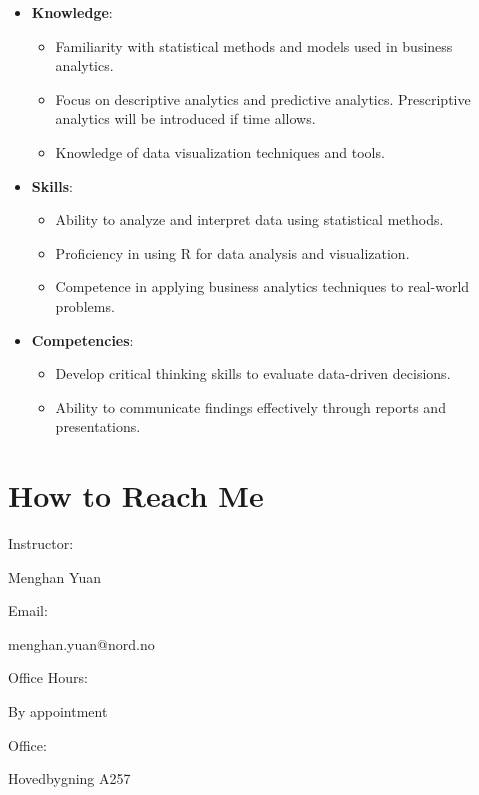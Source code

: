 \documentclass[
  12pt,
  letterpaper,
]{scrbook}
\providecommand{\tightlist}{%
  \setlength{\itemsep}{0pt}\setlength{\parskip}{0pt}}
\renewcommand{\tightlist}{\setlength{\itemsep}{0.5\baselineskip}\setlength{\parskip}{0.2\baselineskip}}
\theoremstyle{definition}
\theoremstyle{plain}
\theoremstyle{remark}
\begin{document}
\begin{itemize}
\tightlist
\item
  \textbf{Knowledge}:

  \begin{itemize}
  \tightlist
  \item
    Familiarity with statistical methods and models used in business
    analytics.
  \item
    Focus on descriptive analytics and predictive analytics.
    Prescriptive analytics will be introduced if time allows.
  \item
    Knowledge of data visualization techniques and tools.
  \end{itemize}
\item
  \textbf{Skills}:

  \begin{itemize}
  \tightlist
  \item
    Ability to analyze and interpret data using statistical methods.
  \item
    Proficiency in using R for data analysis and visualization.
  \item
    Competence in applying business analytics techniques to real-world
    problems.
  \end{itemize}
\item
  \textbf{Competencies}:

  \begin{itemize}
  \tightlist
  \item
    Develop critical thinking skills to evaluate data-driven decisions.
  \item
    Ability to communicate findings effectively through reports and
    presentations.
  \end{itemize}
\end{itemize}

\section{How to Reach Me}\label{how-to-reach-me}

Instructor:

Menghan Yuan

Email:

menghan.yuan@nord.no

Office Hours:

By appointment

Office:

Hovedbygning A257

~
\end{document}
